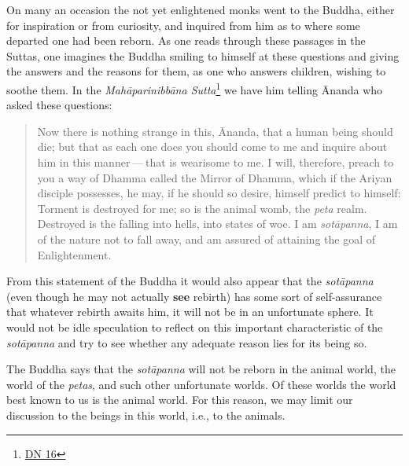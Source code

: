 On many an occasion the not yet enlightened monks went to the Buddha, either for inspiration or from curiosity, and inquired from him as to where some departed one had been reborn. As one reads through these passages in the Suttas, one imagines the Buddha smiling to himself at these questions and giving the answers and the reasons for them, as one who answers children, wishing to soothe them. In the \emph{Mahāparinibbāna Sutta}\footnote{\href{https://suttacentral.net/dn16/en/bodhi}{DN 16}} we have him telling Ānanda who asked these questions:

\begin{quote}
Now there is nothing strange in this, Ānanda, that a human being should die; but that as each one does you should come to me and inquire about him in this manner --- that is wearisome to me. I will, therefore, preach to you a way of Dhamma called the Mirror of Dhamma, which if the Ariyan disciple possesses, he may, if he should so desire, himself predict to himself: Torment is destroyed for me; so is the animal womb, the \emph{peta} realm. Destroyed is the falling into hells, into states of woe. I am \emph{sotāpanna}, I am of the nature not to fall away, and am assured of attaining the goal of Enlightenment.
\end{quote}

From this statement of the Buddha it would also appear that the \emph{sotāpanna} (even though he may not actually \textbf{see} rebirth) has some sort of self-assurance that whatever rebirth awaits him, it will not be in an unfortunate sphere. It would not be idle speculation to reflect on this important characteristic of the \emph{sotāpanna} and try to see whether any adequate reason lies for its being so.

The Buddha says that the \emph{sotāpanna} will not be reborn in the animal world, the world of the \emph{petas}, and such other unfortunate worlds. Of these worlds the world best known to us is the animal world. For this reason, we may limit our discussion to the beings in this world, i.e., to the animals.

